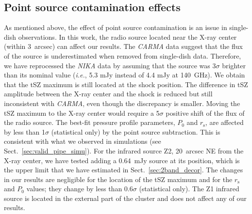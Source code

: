 \subsection{Point source contamination effects}
\label{sec:ps_sub_effect}
As mentioned above, the effect of point source contamination is an issue in single-dish observations. In this work, the radio source located near the \mbox{X-ray} center (within 3~arcsec) can affect our results. The {\it CARMA} data suggest that the flux of the source is underestimated when removed from single-dish data. Therefore, we have reprocessed the {\it NIKA} data by assuming that the source was 3$\sigma$ brighter than its nominal value ({\it i.e.}, 5.3 mJy instead of 4.4 mJy at 140~GHz). We obtain that the tSZ maximum is still located at the shock position. The difference in tSZ amplitude between the \mbox{X-ray} center and the shock is reduced but still inconsistent with {\it CARMA}, even though the discrepancy is smaller. Moving the tSZ maximum to the \mbox{X-ray} center would require a 5$\sigma$ positive shift of the flux of the radio source. The best-fit pressure profile parameters, $P_0$ and $r_{\mathrm{s}}$, are affected by less than 1$\sigma$ (statistical only) by the point source subtraction. This is consistent with what we observed in simulations (see Sect.~\ref{sec:valid_pipe_simu}). For the infrared source Z2, 20~arcsec NE from the \mbox{X-ray} center, we have tested adding a 0.64~mJy source at its position, which is the upper limit that we have estimated in Sect.~\ref{sec:2band_decor}. The changes in our results are negligible for the location of the tSZ maximum and for the $r_{\mathrm{s}}$ and $P_0$ values; they change by less than 0.6$\sigma$ (statistical only). The Z1 infrared source is located in the external part of the cluster and does not affect any of our results.

